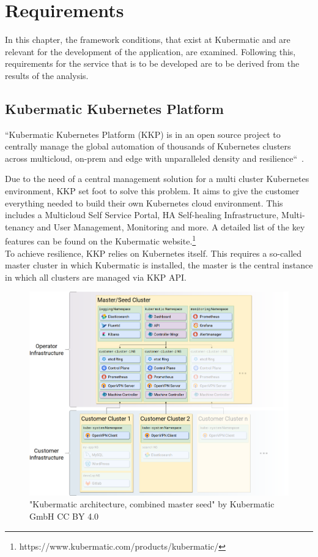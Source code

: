 \chapter{Requirements}

In this chapter, the framework conditions, that exist at Kubermatic and are relevant for the development of the application, are examined.
Following this, requirements for the service that is to be developed are to be derived from the results of the analysis.

\section{Kubermatic Kubernetes Platform}
``Kubermatic Kubernetes Platform (KKP) is in an open source project to centrally manage the global automation of thousands of Kubernetes clusters across multicloud, on-prem and edge with unparalleled density and resilience``~\cite{KKP-GITHUB}.

Due to the need of a central management solution for a multi cluster Kubernetes environment, KKP set foot to solve this problem.
It aims to give the customer everything needed to build their own Kubernetes cloud environment. 
This includes a Multicloud Self Service Portal, HA Self-healing Infrastructure, Multi-tenancy and User Management, Monitoring and more.
A detailed list of the key features can be found on the Kubermatic website.\footnote{https://www.kubermatic.com/products/kubermatic/}
\\
To achieve resilience, KKP relies on Kubernetes itself.
This requires a so-called master cluster in which Kubermatic is installed, the master is the central instance in which all clusters are managed via KKP API.

\begin{figure}[H]
    \centering
    \includegraphics[width=1\textwidth, left]{media/05/kkp}
    \caption{"Kubermatic architecture, combined master seed" by Kubermatic GmbH CC BY 4.0}
    \label{fig:kubermatic}
\end{figure}

